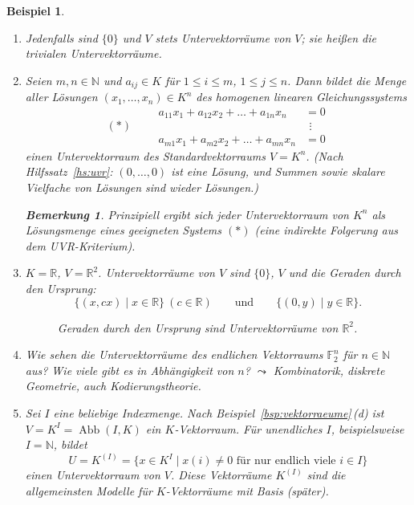 \documentclass[a4paper]{article}
\theoremstyle{kurzskript}
\newtheorem{beispiel}[satz]{Beispiel}
\newtheorem*{bem}{Bemerkung}
\newcommand{\N}{\mathbb{N}}
\newcommand{\R}{\mathbb{R}}
\begin{document}
\begin{beispiel}
\leavevmode
\begin{enumerate}[label=(\alph*)]
  \item Jedenfalls sind $\{0\}$ und $V$ stets Untervektorräume von $V$; sie heißen die \emph{trivialen} Untervektorräume.
  \item Seien $m, n \in \N$ und $a_{ij} \in K$ für $1 \leq i \leq m$, $1 \leq j \leq n$. Dann bildet die Menge aller Lösungen $(x_1, \dots, x_n) \in K^n$ des homogenen linearen Gleichungssystems
  \[
    (*) \qquad
    \begin{aligned}
      a_{11} x_1 + a_{12} x_2 + \dots + a_{1n} x_n &= 0\\
      &\ \,\vdots\\
      a_{m1} x_1 + a_{m2} x_2 + \dots + a_{mn} x_n &= 0
    \end{aligned}
  \]
  einen Untervektorraum des Standardvektorraums $V = K^n$. (Nach Hilfssatz~\ref{hs:uvr}: $(0, \dots, 0)$ ist eine Lösung, und Summen sowie skalare Vielfache von Lösungen sind wieder Lösungen.)
  \begin{bem}
  Prinzipiell ergibt sich jeder Untervektorraum von $K^n$ als Lösungsmenge eines geeigneten Systems $(*)$ (eine indirekte Folgerung aus dem UVR-Kriterium).
  \end{bem}
  \item $K = \R$, $V = \R^2$. Untervektorräume von $V$ sind $\{0\}$, $V$ und die Geraden durch den Ursprung:
  \[
    \{(x, cx) \mid x \in \R\} \ (c \in \R) \qquad\text{und}\qquad \{(0, y) \mid y \in \R\}.
  \]
  \begin{figure}[H]
  \centering
  \caption{Geraden durch den Ursprung sind Untervektorräume von $\R^2$.}
  \end{figure}
  \item Wie sehen die Untervektorräume des endlichen Vektorraums $\mathbb{F}_2^n$ für $n \in \N$ aus? Wie viele gibt es in Abhängigkeit von $n$? $\leadsto$ Kombinatorik, diskrete Geometrie, auch Kodierungstheorie.
  \item Sei $I$ eine beliebige Indexmenge. Nach Beispiel~\ref{bsp:vektorraeume}\,(d) ist $V = K^I = \operatorname{Abb}(I, K)$ ein $K$-Vektorraum. Für unendliches $I$, beispielsweise $I = \N$, bildet
  \[
    U = K^{(I)} = \{x \in K^I \mid x(i) \neq 0 \text{ für nur endlich viele } i \in I\}
  \]
  einen Untervektorraum von $V$. Diese Vektorräume $K^{(I)}$ sind die allgemeinsten Modelle für $K$-Vektorräume mit Basis (später).
\end{enumerate}
\end{beispiel}
\end{document}

